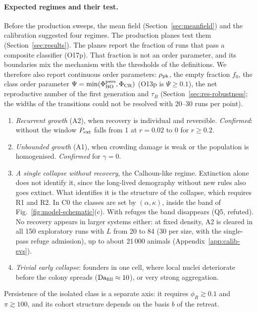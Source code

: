 \paragraph{Expected regimes and their test.}
Before the production sweeps, the mean field (Section~\ref{sec:meanfield}) and the calibration suggested four
regimes. The production planes test them (Section~\ref{sec:results}). The planes report the fraction of runs that
pass a composite classifier (O17p). That fraction is not an order parameter, and its boundaries mix the mechanism
with the thresholds of the definitions. We therefore also report continuous order parameters: $\rho_{\rm pk}$, the
empty fraction $f_0$, the class order parameter $\Psi=\min(\Phi_{\rm BO}^{\rm pers},\Phi_{\rm CR})$ (O13p is
$\Psi\ge0.1$), the net reproductive number of the first generation and $\tau_B$ (Section~\ref{sec:res-robustness}; the widths of the
transitions could not be resolved with 20--30 runs per point).
\begin{enumerate}
  \item \emph{Recurrent growth} (A2), when recovery is individual and reversible. \emph{Confirmed}: without
    the window $P_{\rm ext}$ falls from 1 at $r=0.02$ to 0 for $r\ge0.2$.
  \item \emph{Unbounded growth} (A1), when crowding damage is weak or the population is homogenised.
    \emph{Confirmed} for $\gamma=0$.
  \item \emph{A single collapse without recovery}, the Calhoun-like regime. Extinction alone does not
    identify it, since the long-lived demography without new rules also goes extinct. What identifies it is
    the structure of the collapse, which requires R1 and R2. In \textsf{C0} the classes are set by
    $(\alpha,\kappa)$, inside the band of Fig.~\ref{fig:model-schematic}(c). With refuges the band
    disappears (Q5, refuted). No recovery appears in larger systems either: at fixed density, A2 is cleared in all
    150 exploratory runs with $L$ from 20 to 84 (30 per size, with the single-pass refuge admission), up to about
    21\,000 animals (Appendix~\ref{app:calib-evs}).
  \item \emph{Trivial early collapse}: founders in one cell, where local nuclei deteriorate before the colony
    spreads ($\mathrm{Da}_{\rm fill}\approx10$), or very strong aggregation.
\end{enumerate}
Persistence of the isolated class is a separate axis: it requires $\phi_R\gtrsim0.1$ and $\pi\gtrsim100$, and
its cohort structure depends on the basis $b$ of the retreat.
